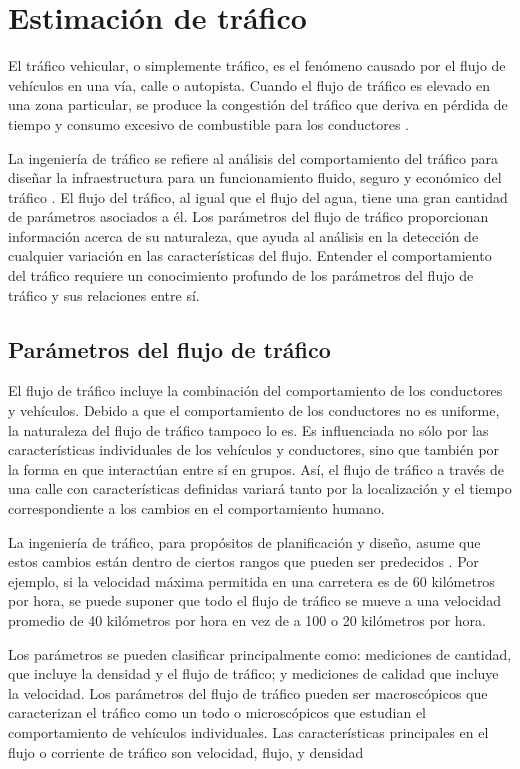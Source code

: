 \chapter{Estimación de tráfico}
\label{cap:5}

El tráfico vehicular, o simplemente tráfico, es el fenómeno causado por el flujo de vehículos en una vía, calle o autopista. Cuando el flujo de tráfico es elevado en una zona particular, se produce la congestión del tráfico que deriva en pérdida de tiempo y consumo excesivo de combustible para los conductores \cite{litman2011smart}.

La ingeniería de tráfico se refiere al análisis del comportamiento del tráfico para diseñar la infraestructura para un funcionamiento fluido, seguro y económico del tráfico \cite{kadiyali1987traffic}. El flujo del tráfico, al igual que el flujo del agua, tiene una gran cantidad de parámetros asociados a él. Los parámetros del flujo de tráfico proporcionan información acerca de su naturaleza, que ayuda al análisis en la detección de cualquier variación en las características del flujo. Entender el comportamiento del tráfico requiere un conocimiento profundo de los parámetros del flujo de tráfico y sus relaciones entre sí.

\section{Parámetros del flujo de tráfico}

El flujo de tráfico incluye la combinación del comportamiento de los conductores y vehículos. Debido a que el comportamiento de los conductores no es uniforme, la naturaleza del flujo de tráfico tampoco lo es. Es influenciada no sólo por las características individuales de los vehículos y conductores, sino que también por la forma en que interactúan entre sí en grupos. Así, el flujo de tráfico a través de una calle con características definidas variará tanto por la localización y el tiempo correspondiente a los cambios en el comportamiento humano.

La ingeniería de tráfico, para propósitos de planificación y diseño, asume que estos cambios están dentro de ciertos rangos que pueden ser predecidos \cite{papacostas1987fundamentals}. Por ejemplo, si la velocidad máxima permitida en una carretera es de 60 kilómetros por hora, se puede suponer que todo el flujo de tráfico se mueve a una velocidad promedio de 40 kilómetros por hora en vez de a 100 o 20 kilómetros por hora. 

Los parámetros se pueden clasificar principalmente como: mediciones de cantidad, que incluye la densidad y el flujo de tráfico; y mediciones de calidad que incluye la velocidad. Los parámetros del flujo de tráfico pueden ser macroscópicos que caracterizan el tráfico como un todo o microscópicos que estudian el comportamiento de vehículos individuales. Las características principales en el flujo o corriente de tráfico son velocidad, flujo, y densidad \cite{may1990fundamentals}

